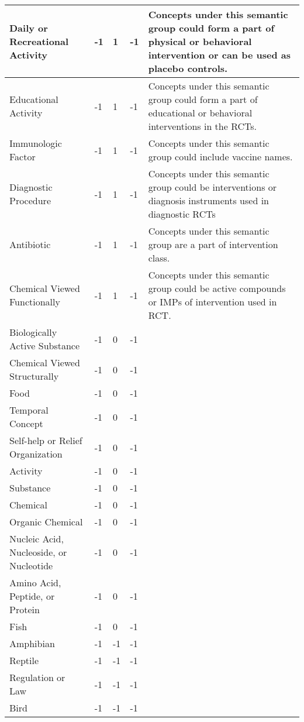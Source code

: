 \documentclass[10.7pt,]{article}
\begin{document}
\begin{longtable}{|l|p{0.3cm}|p{0.3cm}|p{0.3cm}|p{7.9cm}|}
        Daily or Recreational Activity & -1 & 1 & -1 & Concepts under this semantic group could form a part of physical or behavioral intervention or can be used as placebo controls. \\ \hline
        Educational Activity & -1 & 1 & -1 & Concepts under this semantic group could form a part of educational or behavioral interventions in the RCTs. \\ \hline
        Immunologic Factor & -1 & 1 & -1 & Concepts under this semantic group could include vaccine names. \\ \hline
        Diagnostic Procedure & -1 & 1 & -1 & Concepts under this semantic group could be interventions or diagnosis instruments used in diagnostic RCTs \\ \hline
        Antibiotic & -1 & 1 & -1 & Concepts under this semantic group are a part of intervention class. \\ \hline
        Chemical Viewed Functionally & -1 & 1 & -1 & Concepts under this semantic group could be active compounds or IMPs of intervention used in RCT. \\ \hline
        Biologically Active Substance & -1 & 0 & -1 & ~ \\ \hline
        Chemical Viewed Structurally & -1 & 0 & -1 & ~ \\ \hline
        Food & -1 & 0 & -1 & ~ \\ \hline
        Temporal Concept & -1 & 0 & -1 & ~ \\ \hline
        Self-help or Relief Organization & -1 & 0 & -1 & ~ \\ \hline
        Activity & -1 & 0 & -1 & ~ \\ \hline
        Substance & -1 & 0 & -1 & ~ \\ \hline
        Chemical & -1 & 0 & -1 & ~ \\ \hline
        Organic Chemical & -1 & 0 & -1 & ~ \\ \hline
        Nucleic Acid, Nucleoside, or Nucleotide & -1 & 0 & -1 & ~ \\ \hline
        Amino Acid, Peptide, or Protein & -1 & 0 & -1 & ~ \\ \hline
        Fish & -1 & 0 & -1 & ~ \\ \hline
        Amphibian & -1 & -1 & -1 & ~ \\ \hline
        Reptile & -1 & -1 & -1 & ~ \\ \hline
        Regulation or Law & -1 & -1 & -1 & ~ \\ \hline
        Bird & -1 & -1 & -1 & ~ \\ \hline

\end{longtable}
\end{document}
